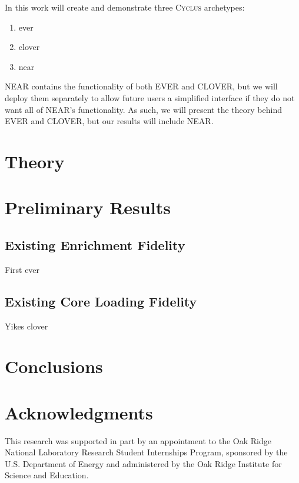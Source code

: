 \documentclass{anstrans}
\newcommand{\cyclus}{\textsc{Cyclus}\xspace} %
\begin{document}
In this work will create and demonstrate three \cyclus archetypes:
\begin{enumerate}
    \item \gls{ever}
    \item \gls{clover}
    \item \gls{near}
\end{enumerate}

NEAR contains the functionality of both EVER and CLOVER, but we will deploy
them separately to allow future users a simplified interface if they do not
want all of NEAR's functionality. As such, we will present the theory behind
EVER and CLOVER, but our results will include NEAR.

\section{Theory}



\cite{Car1953}


\section{Preliminary Results}



\subsection{Existing Enrichment Fidelity}

First
\gls{ever}


\subsection{Existing Core Loading Fidelity}

Yikes
\gls{clover}


\section{Conclusions}




\section{Acknowledgments}

This research was supported in part by an appointment to the Oak Ridge National Laboratory Research Student Internships Program, sponsored by the U.S. Department of Energy and administered by the Oak Ridge Institute for Science and Education.
\end{document}
